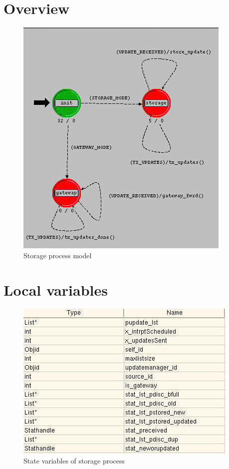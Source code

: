 
\section{Overview}
\begin{figure}[ht]
    \centering
    \includegraphics[scale=0.5]{images/p_storage}
    \caption{Storage process model}
    \label{fig:appendix-b}
\end{figure}

\newpage

\section{Local variables}
\begin{figure}[h]
    \centering
    \includegraphics[width=.7\textwidth]{images/state_variable_storage}
    \caption{State variables of storage process}
    \label{fig:appendix-b_sv}
\end{figure}

